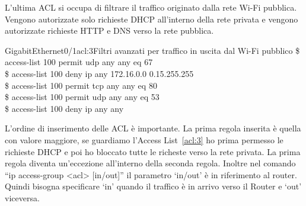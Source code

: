 L'ultima ACL si occupa di filtrare il traffico originato dalla rete Wi-Fi pubblica. Vengono autorizzate solo richieste DHCP all'interno della rete privata e vengono autorizzate richieste HTTP e DNS verso la rete pubblica.

\begin{cmds}[in]{GigabitEthernet0/1}{acl:3}{Filtri avanzati per traffico in uscita dal Wi-Fi pubblico}
    \$ access-list 100 permit udp any any eq 67\\
    \$ access-list 100 deny ip any 172.16.0.0 0.15.255.255\\
    \$ access-list 100 permit tcp any any eq 80\\
    \$ access-list 100 permit udp any any eq 53\\
    \$ access-list 100 deny ip any any
\end{cmds}

L'ordine di inserimento delle ACL \`e importante. La prima regola inserita \`e quella con valore maggiore, se guardiamo l'Access List~\ref{acl:3} ho prima permesso le richieste DHCP e poi ho bloccato tutte le richeste verso la rete privata. La prima regola diventa un'eccezione all'interno della seconda regola. Inoltre nel comando ``ip access-group <acl> [in/out]'' il parametro `in/out' \`e in riferimento al router. Quindi bisogna specificare `in' quando il traffico \`e in arrivo verso il Router e `out' viceversa.

